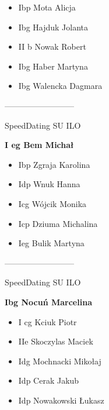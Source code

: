 \documentclass[a4paper,10pt]{article}
\begin{document}
\begin{multicols}{3}
\begin{minipage}[l]{\textwidth}
  \begin{itemize}
    \item Ibp Mota Alicja
    \item Ibg Hajduk Jolanta
    \item II b Nowak Robert
    \item Ibg Haber Martyna
    \item Ibg Walencka Dagmara

    \end{itemize}



\end{minipage}



\begin{minipage}[l]{\textwidth}
--------------------------

  \footnotesize{SpeedDating SU ILO}

  \bfseries{I eg Bem Michał}

  \begin{itemize}
    \item Ibp Zgraja Karolina
    \item Idp Wnuk Hanna
    \item Icg Wójcik Monika
    \item Icp Dziuma Michalina
    \item Ieg Bulik Martyna

    \end{itemize}



\end{minipage}



\begin{minipage}[l]{\textwidth}
--------------------------

  \footnotesize{SpeedDating SU ILO}

  \bfseries{Ibg Nocuń Marcelina}

  \begin{itemize}
    \item I cg Kciuk Piotr
    \item IIe Skoczylas Maciek
    \item Idg Mochnacki Mikołaj
    \item Idp Cerak Jakub
    \item Idp Nowakowski Łukasz

    \end{itemize}




\end{minipage}
\end{multicols}
\end{document}
